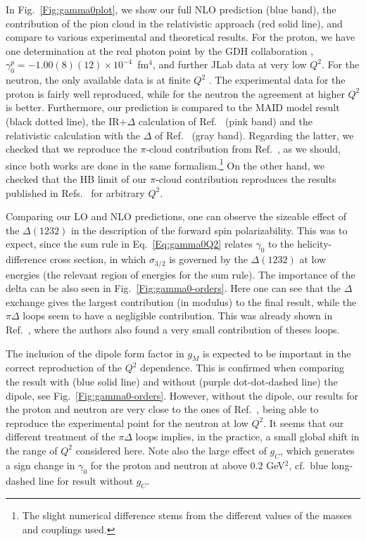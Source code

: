 \documentclass[twocolumn,prc,showpacs,nofootinbib,preprintnumbers,amsmath,amssymb,superscriptaddress]{revtex4-1}
\begin{document}
In Fig.~\ref{Fig:gamma0plot}, we show our full NLO prediction (blue band), the contribution of the pion cloud in the relativistic approach (red solid line), and compare to various experimental and theoretical results. For the proton, we have one determination at the real photon point by the GDH collaboration \cite{Dutz:2003mm}, $\gamma_0^p=-1.00(8)(12)  \times 10^{-4}$~fm$^4$, and further JLab data \cite{Zielinski:2017gwp,Prok:2008ev} at very low $Q^2$.
For the neutron, the only available data is at finite $Q^2$ \cite{Amarian:2004yf, Guler:2015}. 
The experimental data for the proton is fairly well reproduced, while for the neutron the agreement at higher $Q^2$ is better.
Furthermore, our prediction is compared to the MAID model result \cite{Drechsel:2002ar,Amarian:2004yf} (black dotted line), the IR+$\Delta$ calculation of Ref.~\cite{Bernard:2002pw} (pink band) and the relativistic calculation with the $\Delta$ of Ref.~\cite{Bernard:2012hb} (gray band).
Regarding the latter, we checked that we reproduce the $\pi$-cloud contribution from Ref.~\cite{Bernard:2012hb}, as we should, since both works are done in the same formalism.\footnote{The slight numerical difference stems from the different values of the masses and couplings used.}
On the other hand, we checked that the HB limit of our $\pi$-cloud contribution reproduces the results published in Refs.~\cite{Kao:2002cp,Bernard:1995dp} for arbitrary $Q^2$. 


Comparing our LO and NLO predictions, one can observe the sizeable effect of the $\Delta(1232)$ in the description of the forward spin polarizability. This was to expect, since the sum rule in Eq.~\eqref{Eq:gamma0Q2} relates $\gamma_0$ to the helicity-difference cross section, in which $\sigma_{3/2}$ is governed by the $\Delta(1232)$ at low energies (the relevant region of energies for the sum rule). The importance of the delta can be also seen in Fig.~\ref{Fig:gamma0-orders}.
Here one can see that the $\Delta$ exchange gives the largest contribution (in modulus) to the final result, while the $\pi \Delta$ loops seem to have a negligible contribution.
This was already shown in Ref.~\cite{Bernard:2002pw}, where the authors also found a very small contribution of theses loops. 

The inclusion of the dipole form factor in $g_{M}$ is expected to be important in the correct reproduction of the $Q^2$ dependence.
This is confirmed when comparing the result with (blue solid line) and without (purple dot-dot-dashed line) the dipole, see Fig.~\ref{Fig:gamma0-orders}. However, without the dipole, our results for the proton and neutron are very close to the ones of Ref.~\cite{Bernard:2012hb}, being able to reproduce the experimental point for the neutron at low $Q^2$.
It seems that our different treatment of the $\pi \Delta$ loops implies, in the practice, a small global shift in the range of $Q^2$ considered here. Note also the large effect of $g_C$, which generates a sign change in $\gamma_0$ for the proton and neutron at above $0.2$ GeV$^2$, cf.\ blue long-dashed line for result without $g_C$.
\end{document}
